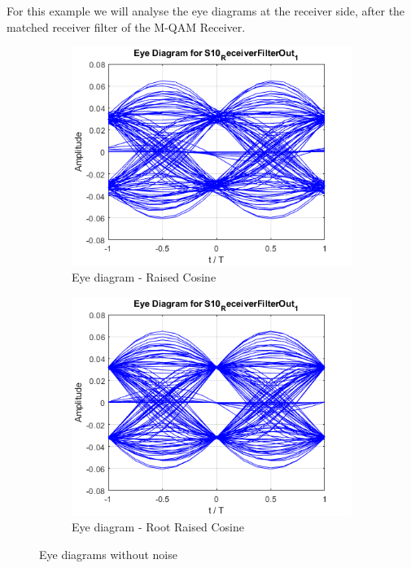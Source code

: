 For this example we will analyse the eye diagrams at the receiver side, after the matched receiver filter of the M-QAM Receiver.
\begin{figure}[H]
	\centering
        \begin{subfigure}{.55\textwidth}
        \centering
        	\includegraphics[scale=0.45]{./lib/m_qam_transmitter/figures/eye_dgm_rcos.png}
            \caption{Eye diagram - Raised Cosine}
            \label{r_cos}
        \end{subfigure}%
        \begin{subfigure}{.55\textwidth}
        \centering
        	\includegraphics[scale=0.45]{./lib/m_qam_transmitter/figures/eye_dgm_rrcos.png}
        	\caption{Eye diagram - Root Raised Cosine}
            \label{rrcos}
        \end{subfigure}
        \caption{Eye diagrams without noise}%
\end{figure}
